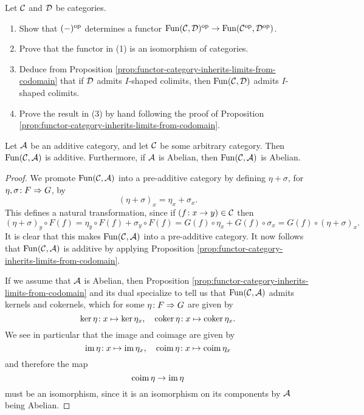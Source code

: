 \begin{exercise}
	Let \(\mathcal{C}\) and \(\mathcal{D}\) be categories.
	\begin{enumerate}[label=(\arabic*)]
	\item Show that \((-)^{\mathrm{op}}\) determines a functor \(\operatorname{Fun}(\mathcal{C},\mathcal{D})^{\mathrm{op}}\to\operatorname{Fun}(\mathcal{C}^{\mathrm{op}},\mathcal{D}^{\mathrm{op}})\).
	\item Prove that the functor in (1) is an isomorphism of categories.
	\item Deduce from Proposition \ref{prop:functor-category-inherits-limits-from-codomain} that if \(\mathcal{D}\) admits \(I\)-shaped colimits, then \(\operatorname{Fun}(\mathcal{C},\mathcal{D})\) admits \(I\)-shaped colimits.
	\item Prove the result in (3) by hand following the proof of Proposition \ref{prop:functor-category-inherits-limits-from-codomain}.
	\end{enumerate}
\end{exercise}
\begin{theorem}
	Let \(\mathcal{A}\) be an additive category, and let \(\mathcal{C}\) be some arbitrary category. Then \(\operatorname{Fun}(\mathcal{C},\mathcal{A})\) is additive. Furthermore, if \(\mathcal{A}\) is Abelian,
	then \(\operatorname{Fun}(\mathcal{C},\mathcal{A})\) is Abelian.
\end{theorem}
\begin{proof}
We promote \(\operatorname{Fun}(\mathcal{C},\mathcal{A})\) into a pre-additive category by defining \(\eta+\sigma\), for \(\eta,\sigma\!:F\Rightarrow G\), by
\[ (\eta+\sigma)_x = \eta_x+\sigma_x. \]
This defines a natural transformation, since if \((f\!:x\to y)\in\mathcal{C}\) then
\[ (\eta+\sigma)_y \circ F(f) = \eta_y\circ F(f) + \sigma_y\circ F(f) = G(f)\circ\eta_x+G(f)\circ\sigma_x = G(f)\circ(\eta+\sigma)_x. \]
It is clear that this makes \(\operatorname{Fun}(\mathcal{C},\mathcal{A})\) into a pre-additive category. It now follows that \(\operatorname{Fun}(\mathcal{C},\mathcal{A})\) is additive by applying Proposition \ref{prop:functor-category-inherits-limits-from-codomain}.

If we assume that \(\mathcal{A}\) is Abelian, then Proposition \ref{prop:functor-category-inherits-limits-from-codomain} and its dual specialize to tell us that \(\operatorname{Fun}(\mathcal{C},\mathcal{A})\) admits
kernels and cokernels, which for some \(\eta\!:F\Rightarrow G\) are given by
\[ \ker\eta\!:x\mapsto\ker\eta_x,\quad\operatorname{coker}\eta\!:x\mapsto\operatorname{coker}\eta_x. \]
We see in particular that the image and coimage are given by
\[ \operatorname{im}\eta\!:x\mapsto\operatorname{im}\eta_x,\quad \operatorname{coim}\eta\!:x\mapsto\operatorname{coim}\eta_x \]
and therefore the map
\[ \operatorname{coim}\eta\to\operatorname{im}\eta \]
must be an isomorphism, since it is an isomorphism on its components by \(\mathcal{A}\) being Abelian.
\end{proof}



